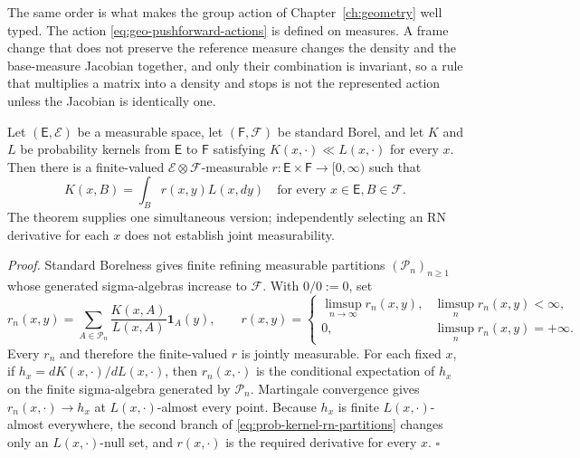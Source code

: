 The same order is what makes the group action of Chapter~\ref{ch:geometry} well typed. The action \eqref{eq:geo-pushforward-actions} is defined on measures. A frame change that does not preserve the reference measure changes the density and the base-measure Jacobian together, and only their combination is invariant, so a rule that multiplies a matrix into a density and stops is not the represented action unless the Jacobian is identically one. 

\medskip
{}
Let $(\mathsf E,\mathscr E)$ be a measurable space, let $(\mathsf F,\mathscr F)$ be standard Borel, and let $K$ and $L$ be probability kernels from $\mathsf E$ to $\mathsf F$ satisfying $K(x,\cdot)\ll L(x,\cdot)$ for every $x$. Then there is a finite-valued $\mathscr E\otimes\mathscr F$-measurable $r:\mathsf E\times\mathsf F\to[0,\infty)$ such that
\[
K(x,B)=\int_B r(x,y)L(x,dy)
\quad\text{for every }x\in\mathsf E, B\in\mathscr F.
\]
The theorem supplies one simultaneous version; independently selecting an RN derivative for each $x$ does not establish joint measurability. 
\medskip

\noindent\emph{Proof.} Standard Borelness gives finite refining measurable partitions $(\mathcal P_n)_{n\geq1}$ whose generated sigma-algebras increase to $\mathscr F$. With $0/0:=0$, set
\begin{equation}
 r_n(x,y)
=\sum_{A\in\mathcal P_n}
  \frac{K(x,A)}{L(x,A)}\mathbf 1_A(y),
\qquad
r(x,y)=
\begin{cases}
\limsup_{n\to\infty}r_n(x,y),&\limsup_n r_n(x,y)<\infty,\\
0,&\limsup_n r_n(x,y)=+\infty.
\end{cases}
\label{eq:prob-kernel-rn-partitions}
\end{equation}
Every $r_n$ and therefore the finite-valued $r$ is jointly measurable. For each fixed $x$, if $h_x=dK(x,\cdot)/dL(x,\cdot)$, then $r_n(x,\cdot)$ is the conditional expectation of $h_x$ on the finite sigma-algebra generated by $\mathcal P_n$. Martingale convergence gives $r_n(x,\cdot)\to h_x$ at $L(x,\cdot)$-almost every point. Because $h_x$ is finite $L(x,\cdot)$-almost everywhere, the second branch of \eqref{eq:prob-kernel-rn-partitions} changes only an $L(x,\cdot)$-null set, and $r(x,\cdot)$ is the required derivative for every $x$. \hfill$\square$

